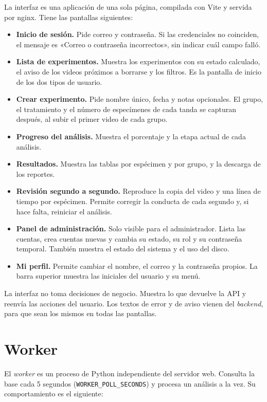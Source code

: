 La interfaz es una aplicación de una sola página, compilada con Vite y servida por nginx. Tiene las
pantallas siguientes:

\begin{itemize}
  \item \textbf{Inicio de sesión.} Pide correo y contraseña. Si las credenciales no coinciden, el mensaje
  es «Correo o contraseña incorrectos», sin indicar cuál campo falló.
  \item \textbf{Lista de experimentos.} Muestra los experimentos con su estado calculado, el aviso de los
  videos próximos a borrarse y los filtros. Es la pantalla de inicio de los dos tipos de usuario.
  \item \textbf{Crear experimento.} Pide nombre único, fecha y notas opcionales. El grupo, el tratamiento y
  el número de especímenes de cada tanda se capturan después, al subir el primer video de cada grupo.
  \item \textbf{Progreso del análisis.} Muestra el porcentaje y la etapa actual de cada análisis.
  \item \textbf{Resultados.} Muestra las tablas por espécimen y por grupo, y la descarga de los reportes.
  \item \textbf{Revisión segundo a segundo.} Reproduce la copia del video y una línea de tiempo por
  espécimen. Permite corregir la conducta de cada segundo y, si hace falta, reiniciar el análisis.
  \item \textbf{Panel de administración.} Solo visible para el administrador. Lista las cuentas, crea cuentas
  nuevas y cambia su estado, su rol y su contraseña temporal. También muestra el estado del sistema y el uso
  del disco.
  \item \textbf{Mi perfil.} Permite cambiar el nombre, el correo y la contraseña propios. La barra superior
  muestra las iniciales del usuario y su menú.
\end{itemize}

La interfaz no toma decisiones de negocio. Muestra lo que devuelve la API y reenvía las acciones del
usuario. Los textos de error y de aviso vienen del \textit{backend}, para que sean los mismos en todas
las pantallas.

\section{Worker}

El \textit{worker} es un proceso de Python independiente del servidor web. Consulta la base cada 5 segundos
(\texttt{WORKER\_POLL\_SECONDS}) y procesa un análisis a la vez. Su comportamiento es el siguiente:

